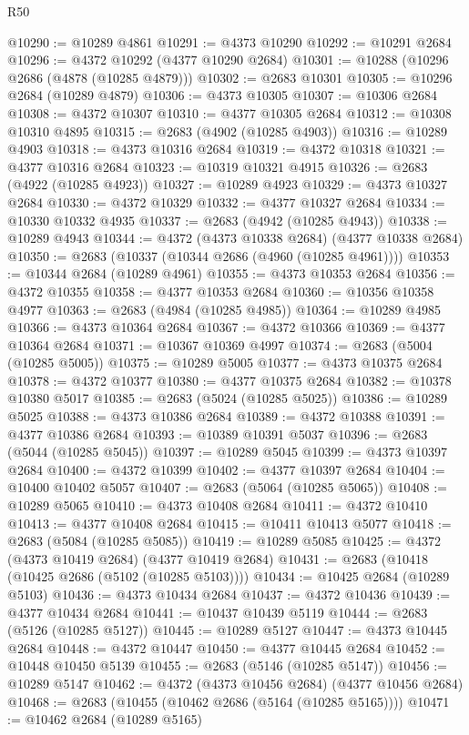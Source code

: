 \begin{lexlean}{R50}
\begin{coremodule}
@10290 := @10289 @4861
@10291 := @4373 @10290
@10292 := @10291 @2684
@10296 := @4372 @10292 (@4377 @10290 @2684)
@10301 := @10288 (@10296 @2686 (@4878 (@10285 @4879)))
@10302 := @2683 @10301
@10305 := @10296 @2684 (@10289 @4879)
@10306 := @4373 @10305
@10307 := @10306 @2684
@10308 := @4372 @10307
@10310 := @4377 @10305 @2684
@10312 := @10308 @10310 @4895
@10315 := @2683 (@4902 (@10285 @4903))
@10316 := @10289 @4903
@10318 := @4373 @10316 @2684
@10319 := @4372 @10318
@10321 := @4377 @10316 @2684
@10323 := @10319 @10321 @4915
@10326 := @2683 (@4922 (@10285 @4923))
@10327 := @10289 @4923
@10329 := @4373 @10327 @2684
@10330 := @4372 @10329
@10332 := @4377 @10327 @2684
@10334 := @10330 @10332 @4935
@10337 := @2683 (@4942 (@10285 @4943))
@10338 := @10289 @4943
@10344 := @4372 (@4373 @10338 @2684) (@4377 @10338 @2684)
@10350 := @2683 (@10337 (@10344 @2686 (@4960 (@10285 @4961))))
@10353 := @10344 @2684 (@10289 @4961)
@10355 := @4373 @10353 @2684
@10356 := @4372 @10355
@10358 := @4377 @10353 @2684
@10360 := @10356 @10358 @4977
@10363 := @2683 (@4984 (@10285 @4985))
@10364 := @10289 @4985
@10366 := @4373 @10364 @2684
@10367 := @4372 @10366
@10369 := @4377 @10364 @2684
@10371 := @10367 @10369 @4997
@10374 := @2683 (@5004 (@10285 @5005))
@10375 := @10289 @5005
@10377 := @4373 @10375 @2684
@10378 := @4372 @10377
@10380 := @4377 @10375 @2684
@10382 := @10378 @10380 @5017
@10385 := @2683 (@5024 (@10285 @5025))
@10386 := @10289 @5025
@10388 := @4373 @10386 @2684
@10389 := @4372 @10388
@10391 := @4377 @10386 @2684
@10393 := @10389 @10391 @5037
@10396 := @2683 (@5044 (@10285 @5045))
@10397 := @10289 @5045
@10399 := @4373 @10397 @2684
@10400 := @4372 @10399
@10402 := @4377 @10397 @2684
@10404 := @10400 @10402 @5057
@10407 := @2683 (@5064 (@10285 @5065))
@10408 := @10289 @5065
@10410 := @4373 @10408 @2684
@10411 := @4372 @10410
@10413 := @4377 @10408 @2684
@10415 := @10411 @10413 @5077
@10418 := @2683 (@5084 (@10285 @5085))
@10419 := @10289 @5085
@10425 := @4372 (@4373 @10419 @2684) (@4377 @10419 @2684)
@10431 := @2683 (@10418 (@10425 @2686 (@5102 (@10285 @5103))))
@10434 := @10425 @2684 (@10289 @5103)
@10436 := @4373 @10434 @2684
@10437 := @4372 @10436
@10439 := @4377 @10434 @2684
@10441 := @10437 @10439 @5119
@10444 := @2683 (@5126 (@10285 @5127))
@10445 := @10289 @5127
@10447 := @4373 @10445 @2684
@10448 := @4372 @10447
@10450 := @4377 @10445 @2684
@10452 := @10448 @10450 @5139
@10455 := @2683 (@5146 (@10285 @5147))
@10456 := @10289 @5147
@10462 := @4372 (@4373 @10456 @2684) (@4377 @10456 @2684)
@10468 := @2683 (@10455 (@10462 @2686 (@5164 (@10285 @5165))))
@10471 := @10462 @2684 (@10289 @5165)

\end{coremodule}
\end{lexlean}
